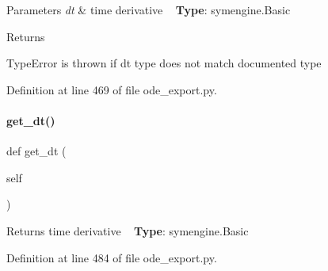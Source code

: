 \begin{DoxyParams}{Parameters}
{\em dt} & time derivative ~\newline
{\bfseries{Type}}\+: symengine.\+Basic\\
\hline
\end{DoxyParams}
\begin{DoxyReturn}{Returns}

\end{DoxyReturn}
\begin{DoxyParagraph}{Type\+Error}
is thrown if dt type does not match documented type 
\end{DoxyParagraph}


Definition at line 469 of file ode\+\_\+export.\+py.

\mbox{\label{classamici_1_1ode__export_1_1_state_a76a215855520a5ed9d41bfddf22b1162}} 
\paragraph{\texorpdfstring{get\_dt()}{get\_dt()}}
{\footnotesize\ttfamily def get\+\_\+dt (\begin{DoxyParamCaption}\item[{}]{self }\end{DoxyParamCaption})}

\begin{DoxyReturn}{Returns}
time derivative ~\newline
{\bfseries{Type}}\+: symengine.\+Basic 
\end{DoxyReturn}


Definition at line 484 of file ode\+\_\+export.\+py.


